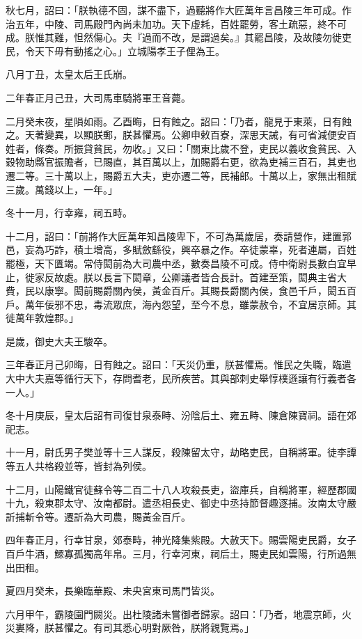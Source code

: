 \begin{pinyinscope}
秋七月，詔曰：「朕執德不固，謀不盡下，過聽將作大匠萬年言昌陵三年可成。作治五年，中陵、司馬殿門內尚未加功。天下虛耗，百姓罷勞，客土疏惡，終不可成。朕惟其難，怛然傷心。夫『過而不改，是謂過矣。』其罷昌陵，及故陵勿徙吏民，令天下毋有動搖之心。」立城陽孝王子俚為王。

八月丁丑，太皇太后王氏崩。

二年春正月己丑，大司馬車騎將軍王音薨。

二月癸未夜，星隕如雨。乙酉晦，日有蝕之。詔曰：「乃者，龍見于東萊，日有蝕之。天著變異，以顯朕郵，朕甚懼焉。公卿申敕百寮，深思天誡，有可省減便安百姓者，條奏。所振貸貧民，勿收。」又曰：「關東比歲不登，吏民以義收食貧民、入穀物助縣官振贍者，已賜直，其百萬以上，加賜爵右更，欲為吏補三百石，其吏也遷二等。三十萬以上，賜爵五大夫，吏亦遷二等，民補郎。十萬以上，家無出租賦三歲。萬錢以上，一年。」

冬十一月，行幸雍，祠五畤。

十二月，詔曰：「前將作大匠萬年知昌陵卑下，不可為萬歲居，奏請營作，建置郭邑，妄為巧詐，積土增高，多賦斂繇役，興卒暴之作。卒徒蒙辜，死者連屬，百姓罷極，天下匱竭。常侍閎前為大司農中丞，數奏昌陵不可成。侍中衛尉長數白宜早止，徙家反故處。朕以長言下閎章，公卿議者皆合長計。首建至策，閎典主省大費，民以康寧。閎前賜爵關內侯，黃金百斤。其賜長爵關內侯，食邑千戶，閎五百戶。萬年佞邪不忠，毒流眾庶，海內怨望，至今不息，雖蒙赦令，不宜居京師。其徙萬年敦煌郡。」

是歲，御史大夫王駿卒。

三年春正月己卯晦，日有蝕之。詔曰：「天災仍重，朕甚懼焉。惟民之失職，臨遣大中大夫嘉等循行天下，存問耆老，民所疾苦。其與部刺史舉惇樸遜讓有行義者各一人。」

冬十月庚辰，皇太后詔有司復甘泉泰畤、汾陰后土、雍五畤、陳倉陳寶祠。語在郊祀志。

十一月，尉氏男子樊並等十三人謀反，殺陳留太守，劫略吏民，自稱將軍。徒李譚等五人共格殺並等，皆封為列侯。

十二月，山陽鐵官徒蘇令等二百二十八人攻殺長吏，盜庫兵，自稱將軍，經歷郡國十九，殺東郡太守、汝南都尉。遣丞相長史、御史中丞持節督趣逐捕。汝南太守嚴訢捕斬令等。遷訢為大司農，賜黃金百斤。

四年春正月，行幸甘泉，郊泰畤，神光降集紫殿。大赦天下。賜雲陽吏民爵，女子百戶牛酒，鰥寡孤獨高年帛。三月，行幸河東，祠后土，賜吏民如雲陽，行所過無出田租。

夏四月癸未，長樂臨華殿、未央宮東司馬門皆災。

六月甲午，霸陵園門闕災。出杜陵諸未嘗御者歸家。詔曰：「乃者，地震京師，火災婁降，朕甚懼之。有司其悉心明對厥咎，朕將親覽焉。」


\end{pinyinscope}

